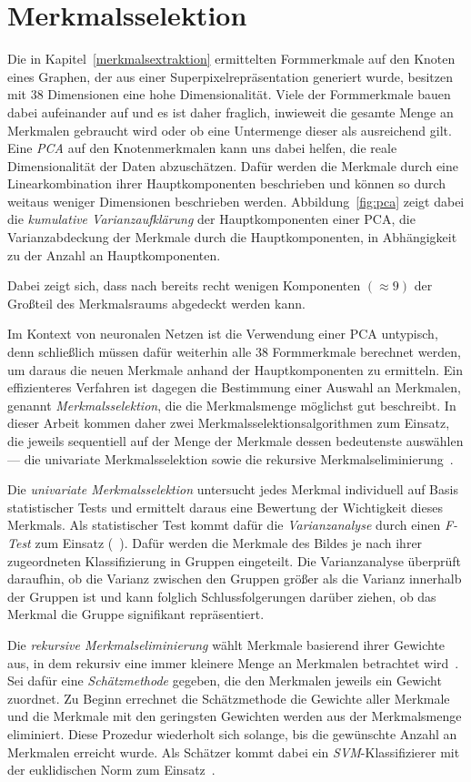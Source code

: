 \section{Merkmalsselektion}
\label{merkmalsselektion}

Die in Kapitel~\ref{merkmalsextraktion} ermittelten Formmerkmale auf den Knoten eines Graphen, der aus einer Superpixelrepräsentation generiert wurde, besitzen mit $38$ Dimensionen eine hohe Dimensionalität.
Viele der Formmerkmale bauen dabei aufeinander auf und es ist daher fraglich, inwieweit die gesamte Menge an Merkmalen gebraucht wird oder ob eine Untermenge dieser als ausreichend gilt.
Eine \emph{\gls{PCA}} auf den Knotenmerkmalen kann uns dabei helfen, die reale Dimensionalität der Daten abzuschätzen.
Dafür werden die Merkmale durch eine Linearkombination ihrer Hauptkomponenten beschrieben und können so durch weitaus weniger Dimensionen beschrieben werden.
Abbildung~\ref{fig:pca} zeigt dabei die \emph{kumulative Varianzaufklärung} der Hauptkomponenten einer \gls{PCA}, \dhe{} die Varianzabdeckung der Merkmale durch die Hauptkomponenten, in Abhängigkeit zu der Anzahl an Hauptkomponenten.

Dabei zeigt sich, dass nach bereits recht wenigen Komponenten $\left(\approx 9\right)$ der Großteil des Merkmalsraums abgedeckt werden kann.

Im Kontext von neuronalen Netzen ist die Verwendung einer \gls{PCA} untypisch, denn schließlich müssen dafür weiterhin alle $38$ Formmerkmale berechnet werden, um daraus die neuen Merkmale anhand der Hauptkomponenten zu ermitteln.
Ein effizienteres Verfahren ist dagegen die Bestimmung einer Auswahl an Merkmalen, genannt \emph{Merkmalsselektion}, die die Merkmalsmenge möglichst gut beschreibt.
In dieser Arbeit kommen daher zwei Merkmalsselektionsalgorithmen zum Einsatz, die jeweils sequentiell auf der Menge der Merkmale dessen bedeutenste auswählen — die univariate Merkmalsselektion sowie die rekursive Merkmalseliminierung~\cite{scikitlearn}.

Die \emph{univariate Merkmalsselektion} untersucht jedes Merkmal individuell auf Basis statistischer Tests und ermittelt daraus eine Bewertung der Wichtigkeit dieses Merkmals.
Als statistischer Test kommt dafür die \emph{Varianzanalyse} durch einen \emph{F-Test} zum Einsatz (\vgl{}~\cite{scikitlearn}).
Dafür werden die Merkmale des Bildes je nach ihrer zugeordneten Klassifizierung in Gruppen eingeteilt.
Die Varianzanalyse überprüft daraufhin, ob die Varianz zwischen den Gruppen größer als die Varianz innerhalb der Gruppen ist und kann folglich Schlussfolgerungen darüber ziehen, ob das Merkmal die Gruppe signifikant repräsentiert.

Die \emph{rekursive Merkmalseliminierung} wählt Merkmale basierend ihrer Gewichte aus, in dem rekursiv eine immer kleinere Menge an Merkmalen betrachtet wird~\cite{scikitlearn}.
Sei dafür eine \emph{Schätzmethode} gegeben, die den Merkmalen jeweils ein Gewicht zuordnet.
Zu Beginn errechnet die Schätzmethode die Gewichte aller Merkmale und die Merkmale mit den geringsten Gewichten werden aus der Merkmalsmenge eliminiert.
Diese Prozedur wiederholt sich solange, bis die gewünschte Anzahl an Merkmalen erreicht wurde.
Als Schätzer kommt dabei ein \emph{\gls{SVM}}-Klassifizierer mit der euklidischen Norm zum Einsatz~\cite{scikitlearn}.

